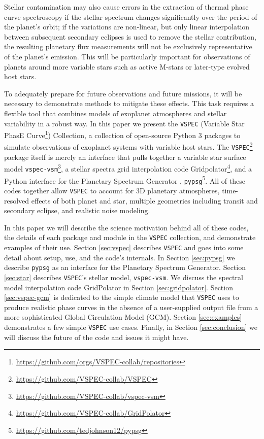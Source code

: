 \documentclass[twocolumn]{aastex631}
\newcommand{\vspec}[1]{\texttt{VSPEC}#1}
\begin{document}
Stellar contamination may also cause errors in the extraction of thermal phase curve spectroscopy if the stellar spectrum changes significantly over the period of the planet's orbit; if the variations are non-linear, but only linear interpolation between subsequent secondary eclipses is used to remove the stellar contribution, the resulting planetary flux measurements will not be exclusively representative of the planet's emission. This will be particularly important for observations of planets around more variable stars such as active M-stars or later-type evolved host stars. %

To adequately prepare for future observations and future missions, it will be necessary to demonstrate methods to mitigate these effects. This task requires a flexible tool that combines models of exoplanet atmospheres and stellar variability in a robust way. In this paper we present the \vspec{} (Variable Star PhasE Curve\footnote{\url{https://github.com/orgs/VSPEC-collab/repositories}}) Collection, a collection of open-source Python 3 packages to simulate observations of exoplanet systems with variable host stars. The \vspec{}\footnote{\url{https://github.com/VSPEC-collab/VSPEC}} package itself is merely an interface that pulls together a variable star surface model \texttt{vspec-vsm}\footnote{\url{https://github.com/VSPEC-collab/vspec-vsm}}, a stellar spectra grid interpolation code Gridpolator\footnote{\url{https://github.com/VSPEC-collab/GridPolator}}, and a Python interface for the Planetary Spectrum Generator \citep[PSG,][]{villanueva2018}, \texttt{pypsg}\footnote{\url{https://github.com/tedjohnson12/pypsg}}. All of these codes together allow \vspec{} to account for 3D planetary atmospheres, time-resolved effects of both planet and star, multiple geometries including transit and secondary eclipse, and realistic noise modeling.

In this paper we will describe the science motivation behind all of these codes, the details of each package and module in the \vspec{} collection, and demonstrate examples of their use. Section \ref{sec:vspec} describes \vspec{} and goes into some detail about setup, use, and the code's internals. In Section \ref{sec:pypsg} we describe \texttt{pypsg} as an interface for the Planetary Spectrum Generator. Section \ref{sec:star} describes \vspec{}'s stellar model, \texttt{vspec-vsm}. We discuss the spectral model interpolation code GridPolator in Section \ref{sec:gridpolator}. Section \ref{sec:vspec-gcm} is dedicated to the simple climate model that \vspec{} uses to produce realistic phase curves in the absence of a user-supplied output file from a more sophisticated Global Circulation Model (GCM). Section \ref{sec:examples} demonstrates a few simple \vspec{} use cases. Finally, in Section \ref{sec:conclusion} we will discuss the future of the code and issues it might have.
\end{document}
